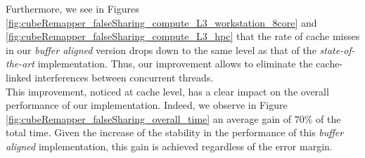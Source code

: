 		Furthermore, we see in Figures \ref{fig:cubeRemapper_falseSharing_compute_L3_workstation_8core} and \ref{fig:cubeRemapper_falseSharing_compute_L3_hpc} that the rate of cache misses in our \emph{buffer aligned} version drops down to the same level as that of the \emph{state-of-the-art} implementation.    Thus, our improvement allows to eliminate the cache-linked interferences between concurrent threads.\\
		This improvement, noticed at cache level, has a clear impact on the overall performance of our implementation.   Indeed, we observe in Figure \ref{fig:cubeRemapper_falseSharing_overall_time} an average gain of $70\%$ of the total time.   Given the increase of the stability in the performance of this \emph{buffer aligned} implementation, this gain is achieved regardless of the error margin.

